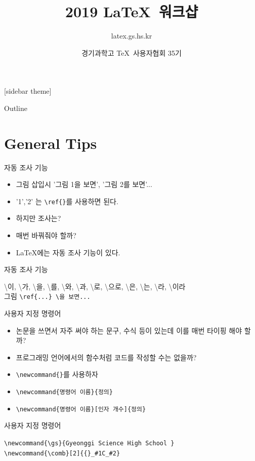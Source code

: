 \documentclass[12pt]{gshs_lecture}
\title[]{2019 \LaTeX\ 워크샵}
\subtitle[]{latex.gs.hs.kr}
\author[]{경기과학고 \TeX\ 사용자협회 35기}
\institute[GSHS]{Gyeonggi Science High School\\ for the gifted}
\date[]{\displaydate{date}}
\newcommand{\tb}{\textbackslash}
\newenvironment{codeblock}[1]{
	\begin{block}{#1}
		\setstretch{1.0}
		\begin{small}
}{
		\end{small}
	\end{block}
}
\begin{document}
\begin{frame}[plain]
\titlepage
\end{frame}
[sidebar theme]

\begin{frame}[t]{Outline}
\tableofcontents%
\end{frame}


\section{General Tips}

\begin{frame}[t]{자동 조사 기능}
	\begin{itemize}
		\item 그림 삽입시 '그림 1을 보면', '그림 2를 보면'...
		\item '1','2' 는 \texttt{\tb ref\{\}}를 사용하면 된다.
		\item 하지만 조사는?
		\item 매번 바꿔줘야 할까?
		\item \LaTeX 에는 자동 조사 기능이 있다.
	\end{itemize}
	
	\begin{codeblock}{자동 조사 기능}
		\tb 이, \tb 가, \tb 을, \tb 를, \tb 와, \tb 과, \tb 로, \tb 으로, \tb 은, \tb 는, \tb 라, \tb 이라 \\
		그림 \texttt{\tb ref\{...\} \tb 을 보면...}
	\end{codeblock}
\end{frame}

\begin{frame}[t]{사용자 지정 명령어}
	\begin{itemize}
		\item 논문을 쓰면서 자주 써야 하는 문구, 수식 등이 있는데 이를 매번 타이핑 해야 할까?
		\item 프로그래밍 언어에서의 함수처럼 코드를 작성할 수는 없을까?
		\item \texttt{\tb newcommand\{\}}를 사용하자
		\item \texttt{\tb newcommand\{명령어 이름\}\{정의\}}
		\item \texttt{\tb newcommand\{명령어 이름\}[인자 개수]\{정의\}}
	\end{itemize}
	
	\begin{codeblock}{사용자 지정 명령어}
		\texttt{\tb newcommand\{\tb gs\}\{Gyeonggi Science High School \}}\\
		\texttt{\tb newcommand\{\tb comb\}[2]\{\{\}\_\#1C\_\#2\}}
	\end{codeblock}
\end{frame}
\end{document}
